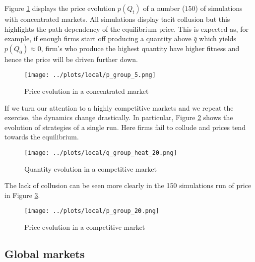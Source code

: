 \documentclass[american]{scrartcl}
\begin{document}
Figure \ref{fig:price_small_local} displays the price evolution $p(Q_t)$ of a number ($150$) of simulations with concentrated markets. All simulations display tacit collusion but this highlights the path dependency of the equilibrium price. This is expected as, for example, if enough firms start off producing a quantity above $\bar{q}$ which yields $p(Q_0) \approx 0$, firm's who produce the highest quantity have higher fitness and hence the price will be driven further down.

\begin{center}
    \begin{figure}[H]
        \center
        \texttt{[image: ../plots/local/p\_group\_5.png]}
        \caption{Price evolution in a concentrated market}
        \label{fig:price_small_local}
    \end{figure}
\end{center}

If we turn our attention to a highly competitive markets and we repeat the exercise, the dynamics change drastically. In particular, Figure \ref{fig:large_local} shows the evolution of strategies of a single run. Here firms fail to collude and prices tend towards the equilibrium.

\begin{center}
    \begin{figure}[H]
        \center
        \texttt{[image: ../plots/local/q\_group\_heat\_20.png]}
        \caption{Quantity evolution in a competitive market}
        \label{fig:large_local}
    \end{figure}
\end{center}

The lack of collusion can be seen more clearly in the 150 simulations run of price in Figure \ref{fig:price_large_local}.

\begin{center}
    \begin{figure}[H]
        \center
        \texttt{[image: ../plots/local/p\_group\_20.png]}
        \caption{Price evolution in a competitive market}
        \label{fig:price_large_local}
    \end{figure}
\end{center}

\subsection{Global markets}
\end{document}
